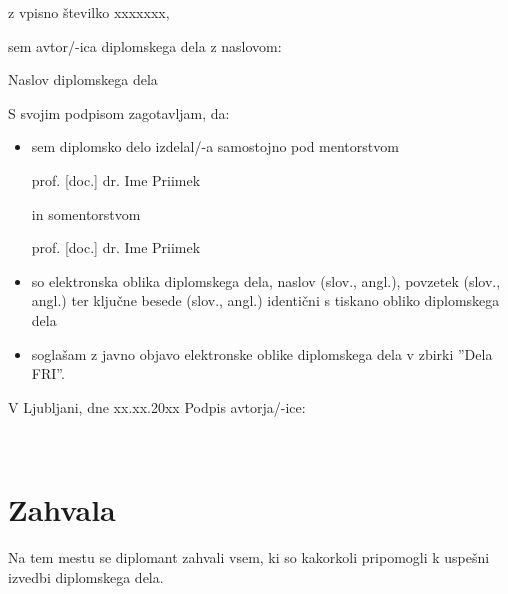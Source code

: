 \documentclass[12pt,a4paper]{book}
\begin{document}
\vspace{0.5cm}
z vpisno številko \hspace{0.5cm} xxxxxxx,

\vspace{1cm}
sem avtor/-ica diplomskega dela z naslovom:
   
\vspace{0.5cm}
Naslov diplomskega dela

\vspace{1.5cm}
S svojim podpisom zagotavljam, da:
\begin{itemize}
	\item sem diplomsko delo izdelal/-a samostojno pod mentorstvom 
	
	prof. [doc.] dr. Ime Priimek
	
	in somentorstvom 
	
	prof. [doc.] dr. Ime Priimek
	
	\item	so elektronska oblika diplomskega dela, naslov (slov., angl.), povzetek (slov., angl.) ter ključne besede (slov., 			angl.) identični s tiskano obliko diplomskega dela
	\item soglašam z javno objavo elektronske oblike diplomskega dela v zbirki ''Dela FRI''.
\end{itemize}

\vspace{1cm}
V Ljubljani, dne xx.xx.20xx \hspace{1cm} Podpis avtorja/-ice:

\newpage 


\ \thispagestyle{empty}

\newpage



\chapter*{Zahvala}

\thispagestyle{empty}

Na tem mestu se diplomant zahvali vsem, ki so kakorkoli pripomogli k uspešni izvedbi diplomskega dela.


\newpage

\end{document}
